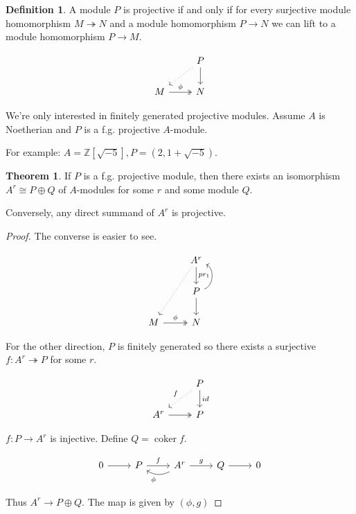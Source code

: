 \documentclass{article}
\theoremstyle{definition}
\newtheorem*{definition}{Definition}
\newtheorem{theorem}{Theorem}
\begin{document}
    \begin{definition}
        A module \(P\) is projective if and only if for every surjective module homomorphism \(M \twoheadrightarrow N\) and a module homomorphism \(P \to N\) we can lift to a module homomorphism \(P \to M\).
        
        \[
        \begin{tikzcd}
            & P \ar[ld, dotted] \ar[d] \\ M \ar[r,"\phi", two heads] & N
        \end{tikzcd}
    \]
        
    \end{definition}

    We're only interested in finitely generated projective modules. Assume \(A\) is Noetherian and \(P\) is a f.g. projective \(A\)-module.

    For example: \(A = \mathbb{Z} [\sqrt{-5}], P = (2, 1+\sqrt{-5})\).

    \begin{theorem}
        If \(P\) is a f.g. projective module, then there exists an isomorphism \(A^r \cong P \oplus Q\) of \(A\)-modules for some \(r\) and some module \(Q\).

        Conversely, any direct summand of \(A^r\) is projective.
    \end{theorem}

    \begin{proof}
        The converse is easier to see.
        
        \[
            \begin{tikzcd}
                & A^r \ar[ddl, dotted] \ar[d,"pr_1"] \\ & P \ar[u, bend right = 70] \ar[d] \\ M \ar[r,"\phi", two heads] & N
            \end{tikzcd}
        \]

        For the other direction, \(P\) is finitely generated so there exists a surjective \(f: A^r \twoheadrightarrow P\) for some \(r\).

        \[
            \begin{tikzcd}
                & P \ar[dl, dotted,"f"'] \ar[d,"id"] \\ A^r \ar[r, two heads] & P
            \end{tikzcd}
        \]

        \(f: P \to A^r\) is injective. Define \(Q = \operatorname{coker} f\).
        
        \[
            \begin{tikzcd}
                0 \ar[r] & P \ar[r,"f"] & A^r \ar[l, bend left, "\phi"] \ar[r,"g"] & Q \ar[r] & 0
            \end{tikzcd}
        \]  

        Thus \(A^r \to P \oplus Q\). The map is given by \((\phi, g)\) 

    \end{proof}
\end{document}
